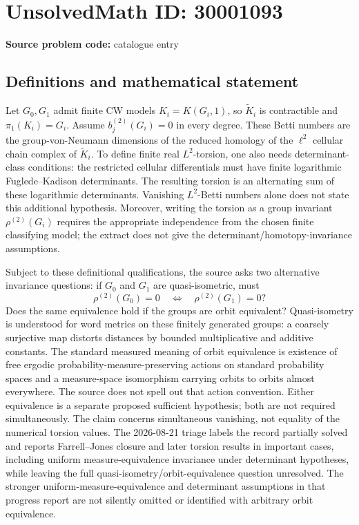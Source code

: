 \documentclass[11pt]{article}
\begin{document}
\section*{UnsolvedMath ID: 30001093}
\textbf{Source problem code:} catalogue entry
\subsection{Definitions and mathematical statement}
Let $G_0,G_1$ admit finite CW models $K_i=K(G_i,1)$, so $\widetilde K_i$ is contractible and $\pi_1(K_i)=G_i$. Assume $b_j^{(2)}(G_i)=0$ in every degree. These Betti numbers are the group-von-Neumann dimensions of the reduced homology of the $\ell^2$ cellular chain complex of $\widetilde K_i$. To define finite real $L^2$-torsion, one also needs determinant-class conditions: the restricted cellular differentials must have finite logarithmic Fuglede--Kadison determinants. The resulting torsion is an alternating sum of these logarithmic determinants. Vanishing $L^2$-Betti numbers alone does not state this additional hypothesis. Moreover, writing the torsion as a group invariant $\rho^{(2)}(G_i)$ requires the appropriate independence from the chosen finite classifying model; the extract does not give the determinant/homotopy-invariance assumptions.\par Subject to these definitional qualifications, the source asks two alternative invariance questions: if $G_0$ and $G_1$ are quasi-isometric, must \[\rho^{(2)}(G_0)=0\quad\Longleftrightarrow\quad\rho^{(2)}(G_1)=0?\] Does the same equivalence hold if the groups are orbit equivalent? Quasi-isometry is understood for word metrics on these finitely generated groups: a coarsely surjective map distorts distances by bounded multiplicative and additive constants. The standard measured meaning of orbit equivalence is existence of free ergodic probability-measure-preserving actions on standard probability spaces and a measure-space isomorphism carrying orbits to orbits almost everywhere. The source does not spell out that action convention. Either equivalence is a separate proposed sufficient hypothesis; both are not required simultaneously. The claim concerns simultaneous vanishing, not equality of the numerical torsion values. The 2026-08-21 triage labels the record partially solved and reports Farrell--Jones closure and later torsion results in important cases, including uniform measure-equivalence invariance under determinant hypotheses, while leaving the full quasi-isometry/orbit-equivalence question unresolved. The stronger uniform-measure-equivalence and determinant assumptions in that progress report are not silently omitted or identified with arbitrary orbit equivalence.
\end{document}
